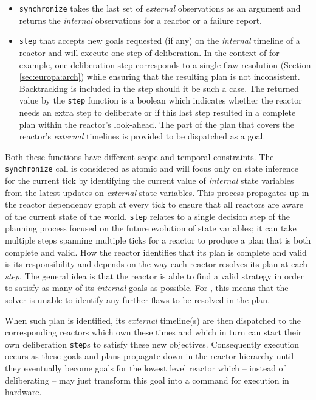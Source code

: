 \begin{itemize}

\item \texttt{synchronize} takes the last set of {\em external}
  observations as an argument and returns the {\em internal}
  observations for a reactor or a failure report.

\item \texttt{step} that accepts new goals requested (if any) on the
  {\em internal} timeline of a reactor and will execute one step of
  deliberation. In the context of \eu for example, one deliberation
  step corresponds to a single flaw resolution (Section
  \ref{sec:europa:arch}) while ensuring that the resulting plan is not
  inconsistent. Backtracking is included in the step should it be such
  a case.  The returned value by the \texttt{step} function is a
  boolean which indicates whether the reactor needs an extra step to
  deliberate or if this last step resulted in a complete plan within
  the reactor's look-ahead. The part of the plan that covers the
  reactor's {\em external} timelines is provided to be dispatched as a
  goal.

\end{itemize}

Both these functions have different scope and temporal constraints.
The \texttt{synchronize} call is considered as atomic and will focus
only on state inference for the current tick by identifying the
current value of {\em internal} state variables from the latest
updates on {\em external} state variables. This process propagates up
in the reactor dependency graph at every tick to ensure that all
reactors are aware of the current state of the world. \texttt{step}
relates to a single decision step of the planning process focused on
the future evolution of state variables; it can take multiple steps
spanning multiple ticks for a reactor to produce a plan that is both
complete and valid. How the reactor identifies that its plan is
complete and valid is its responsibility and depends on the way each
reactor resolves its plan at each {\em step}. The general idea is that
the reactor is able to find a valid strategy in order to satisfy as
many of its {\em internal} goals as possible. For \eu, this means that
the solver is unable to identify any further flaws to be resolved in
the plan.

When such plan is identified, its {\em external} timeline(s) are then
dispatched to the corresponding reactors which own these times and
which in turn can start their own deliberation \texttt{step}s to
satisfy these new objectives. Consequently execution occurs as these
goals and plans propagate down in the reactor hierarchy until they
eventually become goals for the lowest level reactor which -- instead
of deliberating -- may just transform this goal into a command for
execution in hardware.

